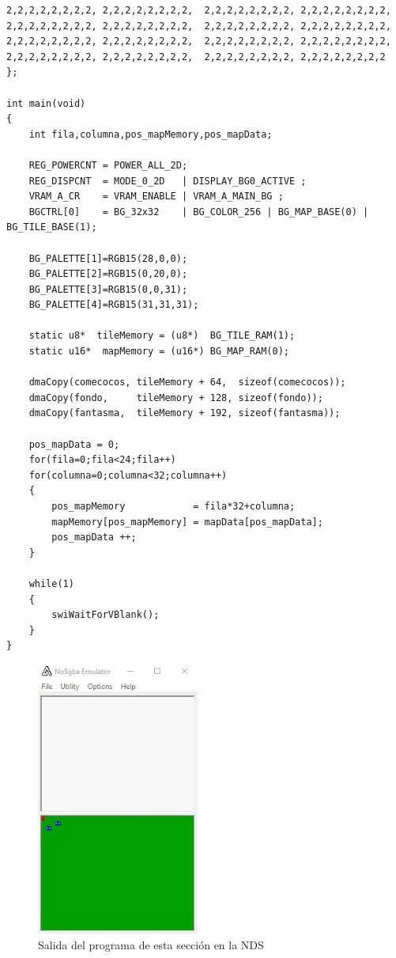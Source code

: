 \begin{example}
\begin{lstlisting}
2,2,2,2,2,2,2,2, 2,2,2,2,2,2,2,2,  2,2,2,2,2,2,2,2, 2,2,2,2,2,2,2,2,
2,2,2,2,2,2,2,2, 2,2,2,2,2,2,2,2,  2,2,2,2,2,2,2,2, 2,2,2,2,2,2,2,2,
2,2,2,2,2,2,2,2, 2,2,2,2,2,2,2,2,  2,2,2,2,2,2,2,2, 2,2,2,2,2,2,2,2,
2,2,2,2,2,2,2,2, 2,2,2,2,2,2,2,2,  2,2,2,2,2,2,2,2, 2,2,2,2,2,2,2,2
};

int main(void)
{
	int fila,columna,pos_mapMemory,pos_mapData;

	REG_POWERCNT = POWER_ALL_2D;
	REG_DISPCNT  = MODE_0_2D   | DISPLAY_BG0_ACTIVE ;
	VRAM_A_CR    = VRAM_ENABLE | VRAM_A_MAIN_BG ;
	BGCTRL[0]    = BG_32x32    | BG_COLOR_256 | BG_MAP_BASE(0) | BG_TILE_BASE(1);

	BG_PALETTE[1]=RGB15(28,0,0);
	BG_PALETTE[2]=RGB15(0,20,0);
	BG_PALETTE[3]=RGB15(0,0,31);
	BG_PALETTE[4]=RGB15(31,31,31);

	static u8*  tileMemory = (u8*)  BG_TILE_RAM(1);
	static u16*  mapMemory = (u16*) BG_MAP_RAM(0);

	dmaCopy(comecocos, tileMemory + 64,  sizeof(comecocos));
	dmaCopy(fondo,     tileMemory + 128, sizeof(fondo));
	dmaCopy(fantasma,  tileMemory + 192, sizeof(fantasma));

	pos_mapData = 0;
	for(fila=0;fila<24;fila++)
	for(columna=0;columna<32;columna++)
	{
		pos_mapMemory            = fila*32+columna;
		mapMemory[pos_mapMemory] = mapData[pos_mapData];
		pos_mapData ++;
	}

	while(1)
	{
		swiWaitForVBlank();
	}
}
\end{lstlisting}
\end{example}

\begin{figure}[t]
	\centering
	\includegraphics[height=9cm]{Figuras/C7/c7_teselas.jpg}
	\caption{Salida del programa de esta sección en la NDS}
	\label{fig_p2_c3_comecocos}
\end{figure}



